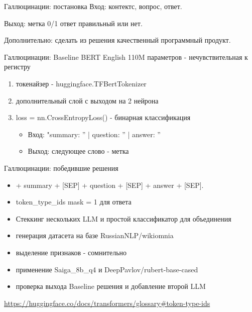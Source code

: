 \documentclass[presentation]{beamer}
\begin{document}
\begin{frame}[label={sec:org148fa35}]{Галлюцинации: постановка}
Вход: контектс, вопрос, ответ.

Выход: метка 0/1 ответ правильный или нет.

Дополнительно: сделать из решения качественный программный продукт.
\end{frame}
\begin{frame}[label={sec:orgb94bbb6}]{Галлюцинации: Baseline}
BERT English 110M параметров - нечувствительная к регистру
\begin{enumerate}
\item токенайзер - huggingface.TFBertTokenizer
\item дополнительный слой с выходом на 2 нейрона
\item loss = nn.CrossEntropyLoss() - бинарная классификация
\begin{itemize}
\item Вход: "summary: '' | question: '' | answer: ''
\item Выход: следующее слово - метка
\end{itemize}
\end{enumerate}
\end{frame}
\begin{frame}[label={sec:org25ad017}]{Галлюцинации: победившие решения}
\begin{itemize}
\item\relax [CLS] + summary + [SEP] + question + [SEP] + answer + [SEP].
\item token\_type\_ids mask = 1 для ответа
\item Стеккинг нескольких LLM и простой классификатор для объединения
\item генерация датасета на базе RussianNLP/wikiomnia
\item выделение признаков - сомнительно
\item применение Saiga\_8b\_q4 и DeepPavlov/rubert-base-cased
\item проверка выхода Baseline решения и добавление второй LLM
\end{itemize}









\url{https://huggingface.co/docs/transformers/glossary\#token-type-ids}
\end{frame}
\end{document}
